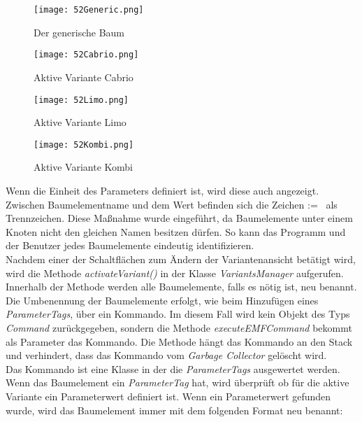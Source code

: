 \begin{figure}[h!]
\centering
\begin{minipage}{.5\textwidth}
  \centering
  \texttt{[image: 52Generic.png]}
  \caption{Der generische Baum}
  \label{ttn.52Generic}
\end{minipage}%
\begin{minipage}{.5\textwidth}
  \centering
  \texttt{[image: 52Cabrio.png]}
  \caption{Aktive Variante Cabrio}
  \label{ttn.52Cabrio}
\end{minipage}
\end{figure}


\begin{figure}[h!]
\centering
\begin{minipage}{.5\textwidth}
  \centering
  \texttt{[image: 52Limo.png]}
  \caption{Aktive Variante Limo}
  \label{ttn.52Limo}
\end{minipage}%
\begin{minipage}{.5\textwidth}
  \centering
  \texttt{[image: 52Kombi.png]}
  \caption{Aktive Variante Kombi}
  \label{ttn.52Kombi}
\end{minipage}
\end{figure}


Wenn die Einheit des Parameters definiert ist, wird diese auch angezeigt. Zwischen Baumelementname und dem Wert befinden sich die Zeichen \glqq :=\grqq~ als Trennzeichen. Diese Maßnahme wurde eingeführt, da Baumelemente unter einem Knoten nicht den gleichen Namen besitzen dürfen. So kann das Programm und der Benutzer jedes Baumelemente eindeutig identifizieren.\\


Nachdem einer der Schaltflächen zum Ändern der Variantenansicht betätigt wird, wird die Methode \textit{activateVariant()} in der Klasse \textit{VariantsManager} aufgerufen. Innerhalb der Methode werden alle Baumelemente, falls es nötig ist, neu benannt. \\


Die Umbenennung der Baumelemente erfolgt, wie beim Hinzufügen eines \textit{ParameterTags}, über ein Kommando. Im diesem Fall wird kein Objekt des Typs \textit{Command} zurückgegeben, sondern die Methode \textit{executeEMFCommand} bekommt als Parameter das Kommando. Die Methode hängt das Kommando an den Stack und verhindert, dass das Kommando vom \textit{Garbage Collector} gelöscht wird.\\


Das Kommando ist eine Klasse in der die \textit{ParameterTags} ausgewertet werden. Wenn das Baumelement ein \textit{ParameterTag} hat, wird überprüft ob für die aktive Variante ein Parameterwert definiert ist. Wenn ein Parameterwert gefunden wurde, wird das Baumelement immer mit dem folgenden Format neu benannt:

